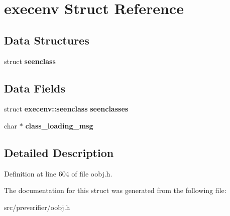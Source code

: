 \section{execenv Struct Reference}
\label{structexecenv}
\subsection*{Data Structures}
\begin{DoxyCompactItemize}
\item 
struct {\bf seenclass}
\end{DoxyCompactItemize}
\subsection*{Data Fields}
\begin{DoxyCompactItemize}
\item 
struct {\bf execenv::seenclass} {\bfseries seenclasses}\label{structexecenv_ae30aa4950409639a83765bf6441322be}

\item 
char $\ast$ {\bfseries class\_\-loading\_\-msg}\label{structexecenv_ac365fbb988c0ea0d5d7c85eddbfa9f51}

\end{DoxyCompactItemize}


\subsection{Detailed Description}


Definition at line 604 of file oobj.h.



The documentation for this struct was generated from the following file:\begin{DoxyCompactItemize}
\item 
src/preverifier/oobj.h\end{DoxyCompactItemize}
